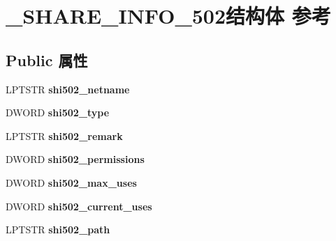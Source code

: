 \hypertarget{struct___s_h_a_r_e___i_n_f_o__502}{}\section{\+\_\+\+S\+H\+A\+R\+E\+\_\+\+I\+N\+F\+O\+\_\+502结构体 参考}
\label{struct___s_h_a_r_e___i_n_f_o__502}
\subsection*{Public 属性}
\begin{DoxyCompactItemize}
\item 
\mbox{\label{struct___s_h_a_r_e___i_n_f_o__502_a8f098d69a95a6ad5b15b6dbef31c0191}} 
L\+P\+T\+S\+TR {\bfseries shi502\+\_\+netname}
\item 
\mbox{\label{struct___s_h_a_r_e___i_n_f_o__502_a46227778d49eae7d279e1996a045510a}} 
D\+W\+O\+RD {\bfseries shi502\+\_\+type}
\item 
\mbox{\label{struct___s_h_a_r_e___i_n_f_o__502_a14f76219f49d32ff4ecfce883828b14c}} 
L\+P\+T\+S\+TR {\bfseries shi502\+\_\+remark}
\item 
\mbox{\label{struct___s_h_a_r_e___i_n_f_o__502_a839c91bb24bd333e82309d1fe7ee971b}} 
D\+W\+O\+RD {\bfseries shi502\+\_\+permissions}
\item 
\mbox{\label{struct___s_h_a_r_e___i_n_f_o__502_a3fcab81dff3c2e65c44ffa4b8a04becf}} 
D\+W\+O\+RD {\bfseries shi502\+\_\+max\+\_\+uses}
\item 
\mbox{\label{struct___s_h_a_r_e___i_n_f_o__502_acb2b64794718f01e847a446c687fb9e6}} 
D\+W\+O\+RD {\bfseries shi502\+\_\+current\+\_\+uses}
\item 
\mbox{\label{struct___s_h_a_r_e___i_n_f_o__502_a04014cedceb89a26cd54d7348e5ba459}} 
L\+P\+T\+S\+TR {\bfseries shi502\+\_\+path}
\item 
\mbox{\label{struct___s_h_a_r_e___i_n_f_o__502_a8c097b65810cfc22755039d7990cce27}} 

\end{DoxyCompactItemize}
